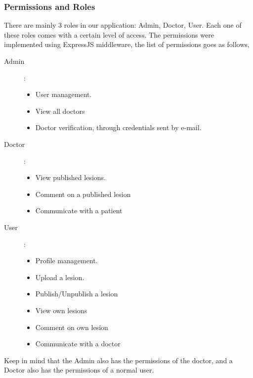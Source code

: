     \subsubsection{Permissions and Roles}
        There are mainly 3 roles in our application: Admin, Doctor, User. Each one of these roles comes with a certain level of access. The permissions were implemented using ExpressJS middleware, the list of permissions goes as follows, 

        \begin{description}
            \item[Admin]:\\
            \begin{itemize}
                \item User management.
                \item View all doctors
                \item Doctor verification, through credentials sent by e-mail.
            \end{itemize}
            \item[Doctor]:\\
            \begin{itemize}
                \item View published lesions.
                \item Comment on a published lesion
                \item Communicate with a patient
            \end{itemize}
            \item[User]:\\
            \begin{itemize}
                \item Profile management.
                \item Upload a lesion.
                \item Publish/Unpublish a lesion
                \item View own lesions
                \item Comment  on own lesion
                \item Communicate with a doctor 
            \end{itemize}
        \end{description}
    
        Keep in mind that the Admin also has the permissions of the doctor, and a Doctor also has the permissions of a normal user.

